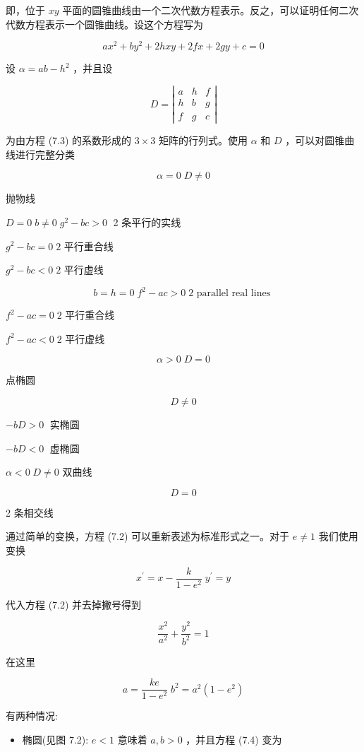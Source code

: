 \documentclass[../main.tex]{subfiles}
\begin{document}
即，位于 \({xy}\) 平面的圆锥曲线由一个二次代数方程表示。反之，可以证明任何二次代数方程表示一个圆锥曲线。设这个方程写为

\[
a{x}^{2} + b{y}^{2} + {2hxy} + {2fx} + {2gy} + c = 0 \tag{7.3}
\]

设 \(\alpha  = {ab} - {h}^{2}\) ，并且设

\[
D = \left| \begin{array}{lll} a & h & f \\  h & b & g \\  f & g & c \end{array}\right|
\]

为由方程 (7.3) 的系数形成的 \(3 \times  3\) 矩阵的行列式。使用 \(\alpha\) 和 \(D\) ，可以对圆锥曲线进行完整分类

\[
\alpha  = 0\;D \neq  0
\]

抛物线

\(D = 0\;b \neq  0\;{g}^{2} - {bc} > 0\;\) 2 条平行的实线

\({g}^{2} - {bc} = 0\;2\) 平行重合线

\({g}^{2} - {bc} < 0\;2\) 平行虚线

\[
b = h = 0\;{f}^{2} - {ac} > 0\;2\text{ parallel real lines }
\]

\({f}^{2} - {ac} = 0\;2\) 平行重合线

\({f}^{2} - {ac} < 0\;2\) 平行虚线

\[
\alpha  > 0\;D = 0
\]

点椭圆

\[
D \neq  0
\]

\(- {bD} > 0\;\) 实椭圆

\(- {bD} < 0\;\) 虚椭圆

\(\alpha  < 0\;D \neq  0\) 双曲线

\[
D = 0
\]

2 条相交线

通过简单的变换，方程 (7.2) 可以重新表述为标准形式之一。对于 \(e \neq  1\) 我们使用变换

\[
{x}^{\prime } = x - \frac{k}{1 - {e}^{2}}\;{y}^{\prime } = y
\]

代入方程 (7.2) 并去掉撇号得到

\[
\frac{{x}^{2}}{{a}^{2}} + \frac{{y}^{2}}{{b}^{2}} = 1 \tag{7.4}
\]

在这里

\[
a = \frac{ke}{1 - {e}^{2}}\;{b}^{2} = {a}^{2}\left( {1 - {e}^{2}}\right)
\]

有两种情况:

\begin{itemize}
\item 椭圆(见图 7.2): \(e < 1\) 意味着 \(a,b > 0\) ，并且方程 (7.4) 变为
\end{itemize}
\end{document}

